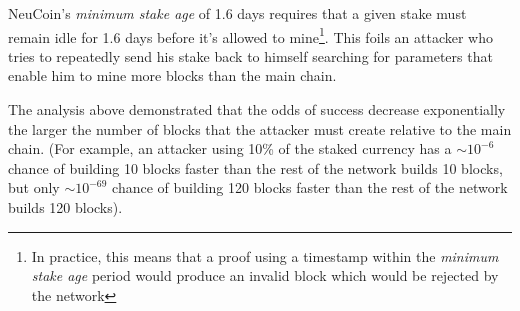 \documentclass[a4paper,11pt]{article}
\begin{document}
NeuCoin's \textit{minimum stake age} of 1.6 days requires that a given stake must remain idle for 1.6 days before it’s allowed to mine\footnote{In practice, this means that a proof using a timestamp within the \textit{minimum stake age} period would produce an invalid block which would be rejected by the network}. This foils an attacker who tries to repeatedly send his stake back to himself searching for parameters that enable him to mine more blocks than the main chain. 

The analysis above demonstrated that the odds of success decrease exponentially the larger the number of blocks that the attacker must create relative to the main chain. (For example, an attacker using 10\% of the staked currency has a $\sim10^{-6}$ chance of building 10 blocks faster than the rest of the network builds 10 blocks, but only $\sim10^{-69}$ chance of building 120 blocks faster than the rest of the network builds 120 blocks).
\end{document}
